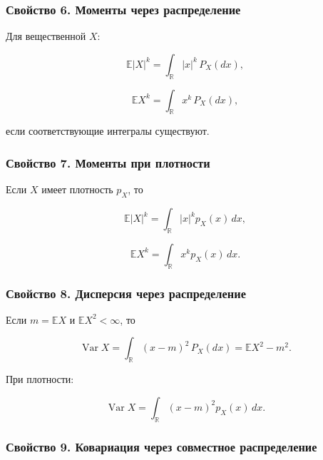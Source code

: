 \documentclass[
  11pt,
  a4paper,
]{article}
\begin{document}
\subsubsection{Свойство 6. Моменты через
распределение}\label{ux441ux432ux43eux439ux441ux442ux432ux43e-6.-ux43cux43eux43cux435ux43dux442ux44b-ux447ux435ux440ux435ux437-ux440ux430ux441ux43fux440ux435ux434ux435ux43bux435ux43dux438ux435}

Для вещественной \(X\):

\[
\mathbb E|X|^k=\int_{\mathbb R} |x|^k\,P_X(dx),
\]

\[
\mathbb EX^k=\int_{\mathbb R} x^k\,P_X(dx),
\]

если соответствующие интегралы существуют.

\subsubsection{Свойство 7. Моменты при
плотности}\label{ux441ux432ux43eux439ux441ux442ux432ux43e-7.-ux43cux43eux43cux435ux43dux442ux44b-ux43fux440ux438-ux43fux43bux43eux442ux43dux43eux441ux442ux438}

Если \(X\) имеет плотность \(p_X\), то

\[
\mathbb E|X|^k=\int_{\mathbb R} |x|^k p_X(x)\,dx,
\]

\[
\mathbb EX^k=\int_{\mathbb R} x^k p_X(x)\,dx.
\]

\subsubsection{Свойство 8. Дисперсия через
распределение}\label{ux441ux432ux43eux439ux441ux442ux432ux43e-8.-ux434ux438ux441ux43fux435ux440ux441ux438ux44f-ux447ux435ux440ux435ux437-ux440ux430ux441ux43fux440ux435ux434ux435ux43bux435ux43dux438ux435}

Если \(m=\mathbb EX\) и \(\mathbb EX^2<\infty\), то

\[
\operatorname{Var}X=\int_{\mathbb R} (x-m)^2\,P_X(dx)
=
\mathbb EX^2-m^2.
\]

При плотности:

\[
\operatorname{Var}X=\int_{\mathbb R} (x-m)^2p_X(x)\,dx.
\]

\subsubsection{Свойство 9. Ковариация через совместное
распределение}\label{ux441ux432ux43eux439ux441ux442ux432ux43e-9.-ux43aux43eux432ux430ux440ux438ux430ux446ux438ux44f-ux447ux435ux440ux435ux437-ux441ux43eux432ux43cux435ux441ux442ux43dux43eux435-ux440ux430ux441ux43fux440ux435ux434ux435ux43bux435ux43dux438ux435}
\end{document}
